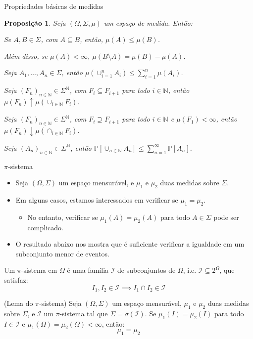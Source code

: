 \documentclass[11pt]{beamer}
\newenvironment{wideenumerate}{\enumerate\addtolength{\itemsep}{10pt}}{\endenumerate}
\newenvironment{halfwideitemize}{\itemize\addtolength{\itemsep}{0.5em}}{\enditemize}
\newtheorem{proposition}{Proposição}
\begin{document}
\begin{frame}{Propriedades básicas de medidas}
\begin{proposition}
	Seja $(\Omega, \Sigma, \mu)$ um espaço de medida. Então:
	\begin{wideenumerate}
		\item Se $A, B \in \Sigma$, com $A \subseteq B$, então, $\mu(A)\leq \mu(B)$.
		\begin{halfwideitemize}
			\item Além disso, se $\mu(A)<\infty$, $\mu(B\setminus A) = \mu(B) - \mu(A)$.
		\end{halfwideitemize}
		\item Seja $A_1, \ldots, A_n \in \Sigma$, então $\mu(\cup_{i=1}^n A_i)\leq \sum_{i=1}^n \mu(A_i) $.
		\item Seja $(F_n)_{n\in \mathbb{N}} \in \Sigma^{\mathbb{N}}$, com $F_i \subseteq F_{i+1}$ para todo $i\in \mathbb{N}$, então $\mu(F_n) \uparrow \mu(\cup_{i \in \mathbb{N}} F_i)$.
				\item Seja $(F_n)_{n\in \mathbb{N}} \in \Sigma^{\mathbb{N}}$, com $F_i \supseteq F_{i+1}$ para todo $i\in \mathbb{N}$ e {\color{blue}$\mu(F_1)<\infty$}, então $\mu(F_n) \downarrow \mu(\cap_{i \in \mathbb{N}} F_i)$.
		\item Seja $(A_n)_{n\in \mathbb{N}} \in \Sigma^{\mathbb{N}}$, então $\mathbb{P}[\cup_{n \in \mathbb{N}}A_n] \leq \sum_{n=1}^\infty  \mathbb{P}[A_n]$.
	\end{wideenumerate}
	\end{proposition}
\end{frame}

\begin{frame}{$\pi$-sistema}
\begin{itemize}
	\item Seja $(\Omega, \Sigma)$ um espaço mensurável, e $\mu_1$ e $\mu_2$ duas medidas sobre $\Sigma$.
	\item Em alguns casos, estamos interessados em verificar se $\mu_1 = \mu_2$.
	\begin{itemize}
		\item No entanto, verificar se $\mu_1(A) = \mu_2(A)$ para todo $A \in \Sigma$ pode ser complicado.
	\end{itemize}
	\item O resultado abaixo nos mostra que é suficiente verificar a igualdade em um subconjunto menor de eventos.
\end{itemize}
	\begin{definition}
		Um $\pi$-sistema em $\Omega$ é uma família $\mathcal{I}$ de subconjuntos de $\Omega$, i.e. $\mathcal{I}\subseteq 2^\Omega$, que satisfaz:
		$$I_1, I_2 \in \mathcal{I} \implies I_1 \cap I_2 \in \mathcal{I}$$
	\end{definition}
	\begin{lemma}
		(Lema do $\pi$-sistema) Seja $(\Omega, \Sigma)$ um espaço mensurável, $\mu_1$ e $\mu_2$ duas medidas sobre $\Sigma$, e $\mathcal{I}$ um $\pi$-sistema tal que $\Sigma = \sigma(\mathcal{I})$. Se $\mu_1(I) = \mu_2(I)$ para todo $I \in \mathcal{I}$ e $\mu_1(\Omega) = \mu_2(\Omega) < \infty$, então:
		$$\mu_1 = \mu_2$$
	\end{lemma}

\end{frame}
\end{document}
